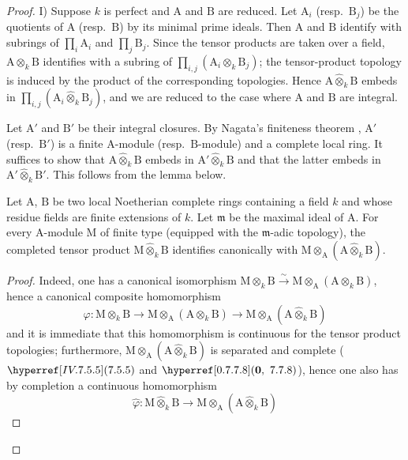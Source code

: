 \begin{proof}
I) Suppose $k$ is perfect and $\mathrm{A}$ and $\mathrm{B}$ are reduced. Let $\mathrm{A}_i$ (resp.\ $\mathrm{B}_j$) be the quotients of $\mathrm{A}$ (resp.\ $\mathrm{B}$) by its minimal prime ideals. Then $\mathrm{A}$ and $\mathrm{B}$ identify with subrings of $\prod_i\mathrm{A}_i$ and $\prod_j\mathrm{B}_j$. Since the tensor products are taken over a field, $\mathrm{A}\otimes_k\mathrm{B}$ identifies with a subring of $\prod_{i,j}(\mathrm{A}_i\otimes_k\mathrm{B}_j)$; the tensor-product topology is induced by the product of the corresponding topologies. Hence $\mathrm{A}\widehat{\otimes}_k\mathrm{B}$ embeds in $\prod_{i,j}(\mathrm{A}_i\widehat{\otimes}_k\mathrm{B}_j)$, and we are reduced to the case where $\mathrm{A}$ and $\mathrm{B}$ are integral.

Let $\mathrm{A}'$ and $\mathrm{B}'$ be their integral closures. By Nagata's finiteness theorem , $\mathrm{A}'$ (resp.\ $\mathrm{B}'$) is a finite $\mathrm{A}$-module (resp.\ $\mathrm{B}$-module) and a complete local ring. It suffices to show that $\mathrm{A}\widehat{\otimes}_k\mathrm{B}$ embeds in $\mathrm{A}'\widehat{\otimes}_k\mathrm{B}$ and that the latter embeds in $\mathrm{A}'\widehat{\otimes}_k\mathrm{B}'$. This follows from the lemma below.

\begin{lemma}[7.5.7.1]
\label{IV.7.5.7.1}
Let $\mathrm{A}$, $\mathrm{B}$ be two local Noetherian complete rings containing a field $k$ and whose residue fields are finite extensions of $k$. Let $\mathfrak{m}$ be the maximal ideal of $\mathrm{A}$. For every $\mathrm{A}$-module $\mathrm{M}$ of finite type (equipped with the $\mathfrak{m}$-adic topology), the completed tensor product $\mathrm{M}\widehat{\otimes}_k\mathrm{B}$  identifies canonically with $\mathrm{M}\otimes_\mathrm{A}(\mathrm{A}\widehat{\otimes}_k\mathrm{B})$.
\end{lemma}

\begin{proof}
Indeed, one has a canonical isomorphism $\mathrm{M}\otimes_k\mathrm{B}\xrightarrow{\sim}\mathrm{M}\otimes_\mathrm{A}(\mathrm{A}\otimes_k\mathrm{B})$, hence a canonical composite homomorphism
\[
  \varphi:\mathrm{M}\otimes_k\mathrm{B}
  \longrightarrow\mathrm{M}\otimes_\mathrm{A}(\mathrm{A}\otimes_k\mathrm{B})
  \longrightarrow\mathrm{M}\otimes_\mathrm{A}(\mathrm{A}\widehat{\otimes}_k\mathrm{B})
\]
and it is immediate that this homomorphism is continuous for the tensor product topologies; furthermore, $\mathrm{M}\otimes_\mathrm{A}(\mathrm{A}\widehat{\otimes}_k\mathrm{B})$ is separated and complete ($\sref{IV.7.5.5}$ and $\sref[0]{0.7.7.8}$), hence one also has by completion a continuous homomorphism
\[
  \widehat{\varphi}:\mathrm{M}\widehat{\otimes}_k\mathrm{B}\to\mathrm{M}\otimes_\mathrm{A}(\mathrm{A}\widehat{\otimes}_k\mathrm{B})
\]


\end{proof}
\end{proof}
